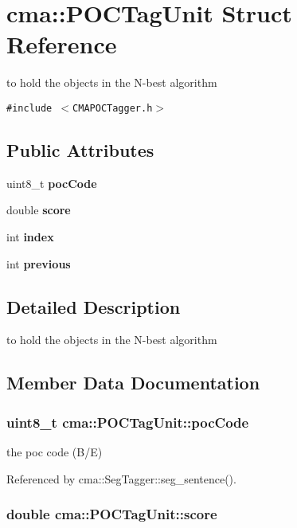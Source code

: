\section{cma::POCTagUnit Struct Reference}
\label{structcma_1_1POCTagUnit}
to hold the objects in the N-best algorithm  


{\tt \#include $<$CMAPOCTagger.h$>$}

\subsection*{Public Attributes}
\begin{CompactItemize}
\item 
uint8\_\-t {\bf pocCode}
\item 
double {\bf score}
\item 
int {\bf index}
\item 
int {\bf previous}
\end{CompactItemize}


\subsection{Detailed Description}
to hold the objects in the N-best algorithm 

\subsection{Member Data Documentation}
\subsubsection{\setlength{\rightskip}{0pt plus 5cm}uint8\_\-t {\bf cma::POCTagUnit::pocCode}}\label{structcma_1_1POCTagUnit_a4a0e15baeb1ad18bbe2103284d5edb9}


the poc code (B/E) 

Referenced by cma::SegTagger::seg\_\-sentence().
\subsubsection{\setlength{\rightskip}{0pt plus 5cm}double {\bf cma::POCTagUnit::score}}\label{structcma_1_1POCTagUnit_dee6f742a3e599ee2093d224d447832f}


